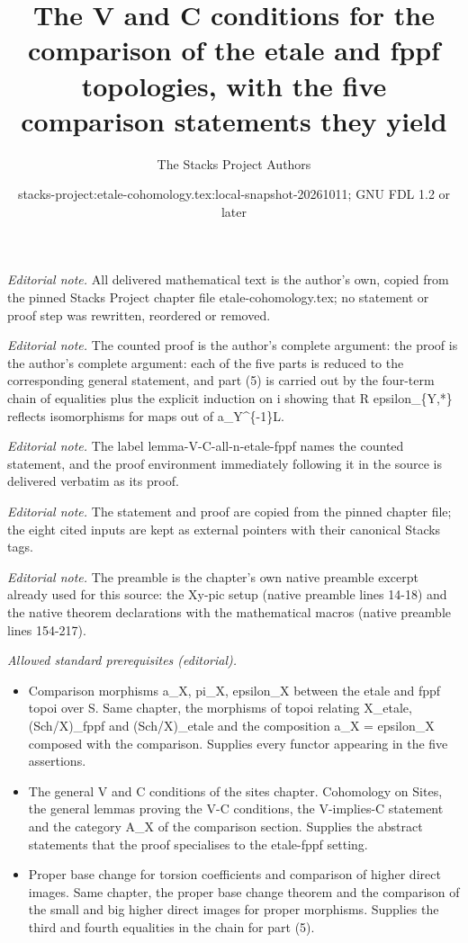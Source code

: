 \documentclass[10pt,a4paper]{amsart}
\title{The V and C conditions for the comparison of the etale and fppf topologies, with the five comparison statements they yield}
\author{The Stacks Project Authors}
\date{stacks-project:etale-cohomology.tex:local-snapshot-20261011; GNU FDL 1.2 or later}
\theoremstyle{plain}
\theoremstyle{definition}
\theoremstyle{remark}
\numberwithin{equation}{subsection}
\begin{document}
\maketitle
\noindent\textit{Editorial note.} All delivered mathematical text is the author's own, copied from the pinned Stacks Project chapter file etale-cohomology.tex; no statement or proof step was rewritten, reordered or removed.\par\medskip
\noindent\textit{Editorial note.} The counted proof is the author's complete argument: the proof is the author's complete argument: each of the five parts is reduced to the corresponding general statement, and part (5) is carried out by the four-term chain of equalities plus the explicit induction on i showing that R epsilon\_\{Y,*\} reflects isomorphisms for maps out of a\_Y\textasciicircum{}\{-1\}L.\par\medskip
\noindent\textit{Editorial note.} The label lemma-V-C-all-n-etale-fppf names the counted statement, and the proof environment immediately following it in the source is delivered verbatim as its proof.\par\medskip
\noindent\textit{Editorial note.} The statement and proof are copied from the pinned chapter file; the eight cited inputs are kept as external pointers with their canonical Stacks tags.\par\medskip
\noindent\textit{Editorial note.} The preamble is the chapter's own native preamble excerpt already used for this source: the Xy-pic setup (native preamble lines 14-18) and the native theorem declarations with the mathematical macros (native preamble lines 154-217).\par\medskip
\noindent\textit{Allowed standard prerequisites (editorial).}\begin{itemize}
\item Comparison morphisms a\_X, pi\_X, epsilon\_X between the etale and fppf topoi over S. Same chapter, the morphisms of topoi relating X\_etale, (Sch/X)\_fppf and (Sch/X)\_etale and the composition a\_X = epsilon\_X composed with the comparison. Supplies every functor appearing in the five assertions.
\item The general V and C conditions of the sites chapter. Cohomology on Sites, the general lemmas proving the V-C conditions, the V-implies-C statement and the category A\_X of the comparison section. Supplies the abstract statements that the proof specialises to the etale-fppf setting.
\item Proper base change for torsion coefficients and comparison of higher direct images. Same chapter, the proper base change theorem and the comparison of the small and big higher direct images for proper morphisms. Supplies the third and fourth equalities in the chain for part (5).
\end{itemize}\medskip
\end{document}
